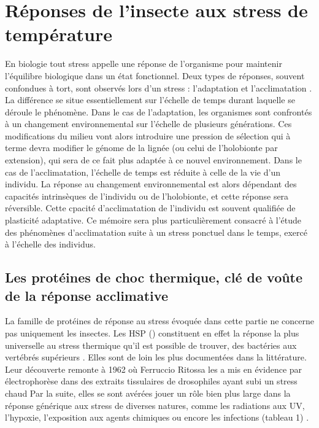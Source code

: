 \chapter{Réponses de l'insecte aux stress de température}

En biologie tout stress appelle une réponse de l'organisme pour maintenir l'équilibre biologique dans un état fonctionnel.
Deux types de réponses, souvent confondues à tort, sont observés lors d'un stress : l'adaptation et l'acclimatation \cite{somero2010}.
La différence se situe essentiellement sur l'échelle de temps durant laquelle se déroule le phénomène.
Dans le cas de l'adaptation, les organismes sont confrontés à un changement environnemental sur l'échelle de plusieurs générations.
Ces modifications du milieu vont alors introduire une pression de sélection qui à terme devra modifier le génome de la lignée (ou celui de l'holobionte par extension), qui sera de ce fait plus adaptée à ce nouvel environnement.
Dans le cas de l'acclimatation, l'échelle de temps est réduite à celle de la vie d'un individu. La réponse au changement environnemental est alors dépendant des capacités intrinsèques de l'individu ou de l'holobionte, et cette réponse sera réversible.
Cette cpacité d'acclimatation de l'individu est souvent qualifiée de plasticité adaptative.
Ce mémoire sera plus particulièrement consacré à l'étude des
phénomènes d'acclimatation suite à un stress ponctuel dans le temps, exercé à l'échelle des individus.

	\section{Les protéines de choc thermique, clé de voûte de la réponse acclimative}

	La famille de protéines de réponse au stress évoquée dans cette partie ne concerne pas uniquement les insectes.
	Les HSP () constituent en effet la réponse la plus universelle au stress thermique qu'il est possible de trouver, des bactéries aux vertébrés supérieurs \cite{lindquist1986}.
	Elles sont de loin les plus documentées dans la littérature.
	Leur découverte remonte à 1962 où Ferruccio Ritossa les a mis en évidence par électrophorèse dans des extraits tissulaires de drosophiles ayant subi un stress chaud \cite{ritossa1996, ritossa1962} %
	Par la suite, elles se sont avérées jouer un rôle bien plus large dans la réponse générique aux stress de diverses natures, comme les radiations aux UV, l'hypoxie, l'exposition aux agents chimiques ou encore les infections (tableau 1) \cite{sorensen2003}.

